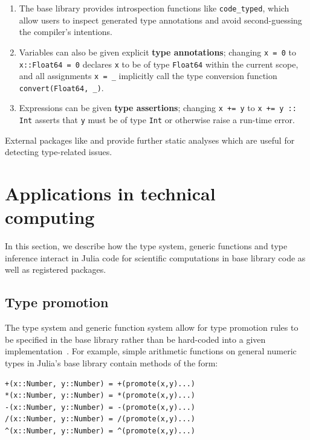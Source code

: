 \documentclass[10pt, preprint]{sigplanconf}
\begin{document}
\begin{enumerate}

	\item The base library provides introspection functions like
	\verb|code_typed|, which allow users to inspect generated type
	annotations and avoid second-guessing the compiler's intentions.

	\item Variables can also be given explicit \textbf{type annotations};
	changing \verb|x = 0| to \verb|x::Float64 = 0| declares \verb|x| to be
	of type \verb|Float64| within the current scope, and all assignments
	\verb|x = _| implicitly call the type conversion function
	\verb|convert(Float64, _)|.

	\item Expressions can be given \textbf{type assertions}; changing
	\verb|x += y| to \verb|x += y :: Int| asserts that \verb|y| must be of
	type \verb|Int| or otherwise raise a run-time error.

\end{enumerate}
%
External packages like  and  provide
further static analyses which are useful for detecting type-related issues.


\section{Applications in technical computing}

In this section, we describe how the type system, generic functions and type
inference interact in Julia code for scientific computations in base library
code as well as registered packages. 

\subsection{Type promotion}

The type system and generic function system allow for type promotion rules to
be specified in the base library rather than be hard-coded into a given
implementation~\cite{Bezanson2012a}. For example, simple arithmetic functions
on general numeric types in Julia's base library contain methods of the form:

\begin{lstlisting}
+(x::Number, y::Number) = +(promote(x,y)...)
*(x::Number, y::Number) = *(promote(x,y)...)
-(x::Number, y::Number) = -(promote(x,y)...)
/(x::Number, y::Number) = /(promote(x,y)...)
^(x::Number, y::Number) = ^(promote(x,y)...)
\end{lstlisting}
\end{document}
